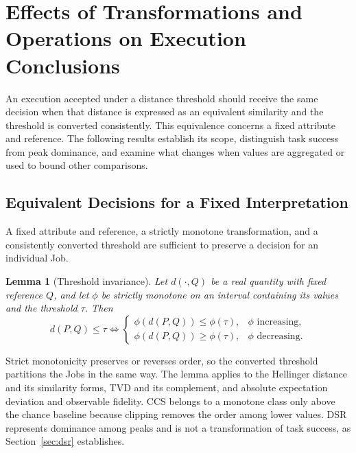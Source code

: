 \documentclass[10pt,conference]{IEEEtran}
\newtheorem{lemma}{Lemma}
\begin{document}
\section{Effects of Transformations and Operations on Execution Conclusions}
\label{sec:analysis}

An execution accepted under a distance threshold should receive the same decision when that distance is expressed as an equivalent similarity and the threshold is converted consistently. This equivalence concerns a fixed attribute and reference. The following results establish its scope, distinguish task success from peak dominance, and examine what changes when values are aggregated or used to bound other comparisons.

\subsection{Equivalent Decisions for a Fixed Interpretation}
\label{sec:threshold}

A fixed attribute and reference, a strictly monotone transformation, and a consistently converted threshold are sufficient to preserve a decision for an individual Job.

\begin{lemma}[Threshold invariance]
\label{lem:threshold}
Let $d(\cdot,Q)$ be a real quantity with fixed reference $Q$, and let $\phi$ be strictly monotone on an interval containing its values and the threshold $\tau$. Then
\begin{equation}
d(P,Q)\leq\tau
\iff
\begin{cases}
\phi(d(P,Q))\leq\phi(\tau), & \phi\text{ increasing},\\
\phi(d(P,Q))\geq\phi(\tau), & \phi\text{ decreasing}.
\end{cases}
\label{eq:threshold-equivalence}
\end{equation}
\end{lemma}

Strict monotonicity preserves or reverses order, so the converted threshold partitions the Jobs in the same way. The lemma applies to the Hellinger distance and its similarity forms, TVD and its complement, and absolute expectation deviation and observable fidelity. CCS belongs to a monotone class only above the chance baseline because clipping removes the order among lower values. DSR represents dominance among peaks and is not a transformation of task success, as Section~\ref{sec:dsr} establishes.
\end{document}
